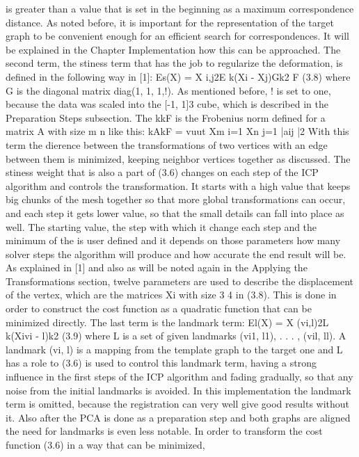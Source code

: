 \documentclass[../structure.tex]{subfiles}
\begin{document}
is greater than a value that is set in the beginning as a maximum
correspondence distance. As noted before, it is important for the representation
of the target graph to be convenient enough for an efficient search for
correspondences. It will be explained in the Chapter Implementation how
this can be approached.
The second term, the stiness term that has the job to regularize the
deformation, is defined in the following way in [1]:
Es(X) =
X
i,j2E
k(Xi - Xj)Gk2
F (3.8)
where G is the diagonal matrix diag(1, 1, 1,!). As mentioned before, ! is set
to one, because the data was scaled into the [-1, 1]3 cube, which is described
in the Preparation Steps subsection. The kkF is the Frobenius norm defined
for a matrix A with size m  n like this:
kAkF =
vuut
Xm
i=1
Xn
j=1 |aij |2
With this term the dierence between the transformations of two vertices
with an edge between them is minimized, keeping neighbor vertices together
as discussed. The stiness weight  that is also a part of (3.6) changes on
each step of the ICP algorithm and controls the transformation. It starts
with a high value that keeps big chunks of the mesh together so that more
global transformations can occur, and each step it gets lower value, so that
the small details can fall into place as well. The starting value, the step with
which it change each step and the minimum of the  is user defined and
it depends on those parameters how many solver steps the algorithm will
produce and how accurate the end result will be.
As explained in [1] and also as will be noted again in the Applying the
Transformations section, twelve parameters are used to describe the displacement
of the vertex, which are the matrices Xi with size 3  4 in (3.8). This
is done in order to construct the cost function as a quadratic function that
can be minimized directly.
The last term is the landmark term:
El(X) =
X
(vi,l)2L
k(Xivi - l)k2 (3.9)
where L is a set of given landmarks (vi1, l1), . . . , (vil, ll). A landmark (vi, l)
is a mapping from the template graph to the target one and L has a role to
(3.6) is used to control this landmark term, having a strong influence in the
first steps of the ICP algorithm and fading gradually, so that any noise from
the initial landmarks is avoided. In this implementation the landmark term
is omitted, because the registration can very well give good results without
it. Also after the PCA is done as a preparation step and both graphs are
aligned the need for landmarks is even less notable.
In order to transform the cost function (3.6) in a way that can be minimized,
\end{document}
